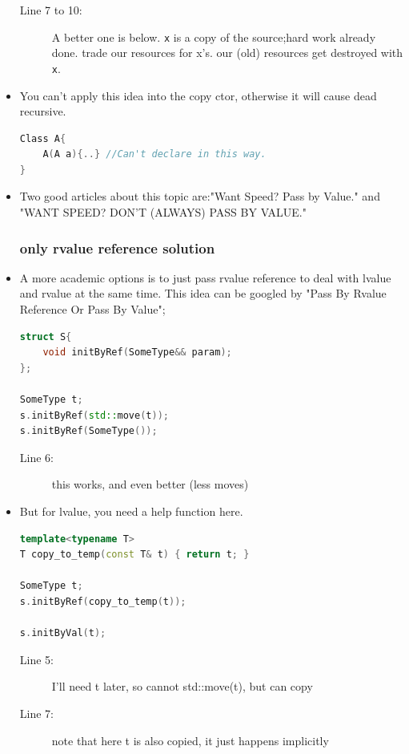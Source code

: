 \documentclass[a4paper,11pt,twoside]{book}
\begin{document}
\begin{itemize}
\begin{description}
	\item[Line 7 to 10:] A better one is below. \texttt{x} is a copy of the source;hard work already done. trade our resources for x's. our (old) resources get destroyed with \texttt{x}.
\end{description}

\item You can't apply this idea into the copy ctor, otherwise it will cause dead recursive.
\begin{lstlisting}[frame=single, language=c++]
Class A{
	A(A a){..} //Can't declare in this way.
}
\end{lstlisting}

\item Two good articles about this topic are:"Want Speed? Pass by Value." and "WANT SPEED? DON'T (ALWAYS) PASS BY VALUE."

\subsubsection{only rvalue  reference solution}
\item A more academic options is to just pass rvalue  reference to deal with lvalue and rvalue at the same time. This idea can be googled by "Pass By Rvalue Reference Or Pass By Value";
\begin{lstlisting}[frame=single, language=c++]
struct S{
    void initByRef(SomeType&& param);
};

SomeType t;
s.initByRef(std::move(t)); 
s.initByRef(SomeType()); 
\end{lstlisting}
\begin{description}
	\item[Line 6:] this works, and even better (less moves)
\end{description}

\item But for lvalue, you need a help function here.
\begin{lstlisting}[frame=single, language=c++]
template<typename T>
T copy_to_temp(const T& t) { return t; }

SomeType t; 
s.initByRef(copy_to_temp(t)); 

s.initByVal(t); 
\end{lstlisting}
\begin{description}
	\item[Line 5:] I'll need t later, so cannot std::move(t), but can copy
	\item[Line 7:] note that here t is also copied, it just happens implicitly
\end{description}


\end{itemize}
\end{document}
